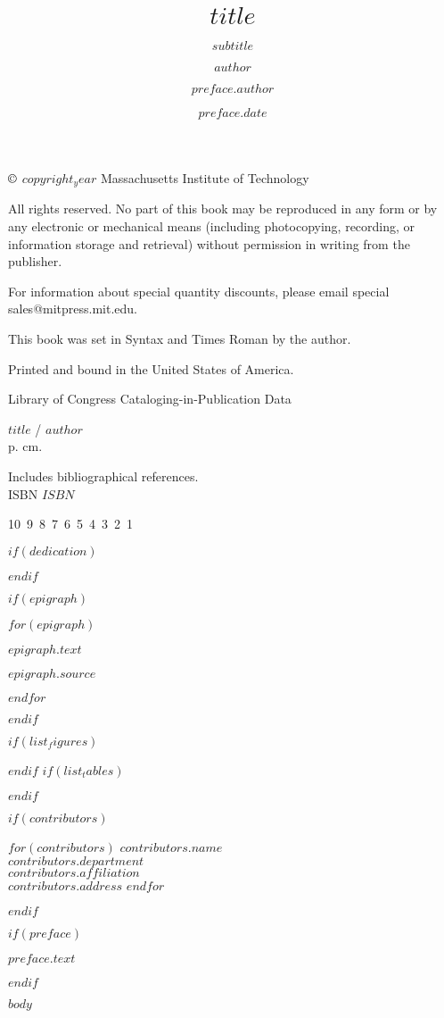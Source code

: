 \documentclass[$class_options$]{Linguistics}
\title{$title$}
\subtitle{$subtitle$}
\author{$author$}
\begin{document}
\halftitlepage

\titlepage

\begin{copyrightpage}

	\(\copyright\) $copyright_year$ Massachusetts Institute of Technology

	All rights reserved. No part of this book may be reproduced in
        any form or by any electronic or mechanical means (including
        photocopying, recording, or information storage and retrieval) without
        permission in writing from the publisher.

	For information about special quantity discounts, please email special sales@mitpress.mit.edu.

	This book was set in Syntax and Times Roman by the author.

	Printed and bound in the United States of America.

	Library of Congress Cataloging-in-Publication Data

	$title$ / $author$\\
	\hspace*{6pt} p. cm.

	Includes bibliographical references.\\
	ISBN $ISBN$
\vfill

10\ 9\ 8\ 7\ 6\ 5\ 4\ 3\ 2\ 1\

\end{copyrightpage}

$if(dedication)$
\dedication{$dedication$}
$endif$

$if(epigraph)$
  \begin{epigraphpage}
  $for(epigraph)$
    \epigraph{$epigraph.text$}{$epigraph.source$}
  $endfor$
  \end{epigraphpage}
$endif$

\tableofcontents
$if(list_figures)$\listoffigures$endif$
$if(list_tables)$\listoftables$endif$

$if(contributors)$
  \begin{contributors}
  $for(contributors)$
    \contrib
    $contributors.name$\\
    $contributors.department$\\
    $contributors.affiliation$\\
    $contributors.address$
  $endfor$
  \end{contributors}
$endif$

$if(preface)$
\begin{preface}
  $preface.text$
  \author{$preface.author$}
  \date{$preface.date$}
\end{preface}
$endif$

$body$

\endmatter



\end{document}
